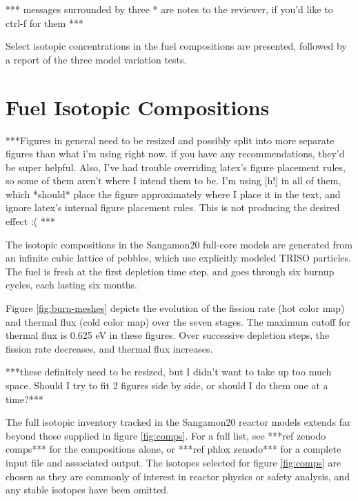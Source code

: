 *** messages surrounded by three * are notes to the reviewer, if you'd like to ctrl-f for them ***

Select isotopic concentrations in the fuel compositions are presented, followed by a report of the three model variation tests.

\section{Fuel Isotopic Compositions}

***Figures in general need to be resized and possibly split into more separate figures than what i'm using right now.  if you have any recommendations, they'd be super helpful.  Also, I've had trouble overriding latex's figure placement rules, so some of them aren't where I intend them to be.  I'm using [h!] in all of them, which *should* place the figure approximately where I place it in the text, and ignore latex's internal figure placement rules.  This is not producing the desired effect :( ***



The isotopic compositions in the Sangamon20 full-core models are generated from an infinite cubic lattice of pebbles, which use explicitly modeled TRISO particles.  The fuel is fresh at the first depletion time step, and goes through six burnup cycles, each lasting six months.

Figure \ref{fig:burn-meshes} depicts the evolution of the fission rate (hot color map) and thermal flux (cold color map) over the seven stages.  The maximum cutoff for thermal flux is 0.625 eV in these figures.  Over successive depletion steps, the fission rate decreases, and thermal flux increases.


***these definitely need to be resized, but I didn't want to take up too much space.  Should I try to fit 2 figures side by side, or should I do them one at a time?***

The full isotopic inventory tracked in the Sangamon20 reactor models extends far beyond those supplied in figure \ref{fig:comps}.  For a full list, see ***ref zenodo comps*** for the compositions alone, or ***ref phlox zenodo*** for a complete input file and associated output.  The isotopes selected for figure \ref{fig:comps} are chosen as they are commonly of interest in reactor physics or safety analysis, and any stable isotopes have been omitted.

